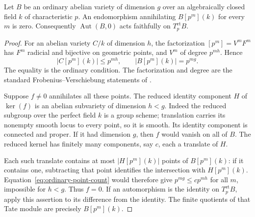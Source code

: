 \begin{lemma}\label{lem:ordinary-etale-faithful}
Let $B$ be an ordinary abelian variety of dimension $g$ over an algebraically closed field $k$ of characteristic $p$. An endomorphism annihilating $B[p^m](k)$ for every $m$ is zero. Consequently $\operatorname{Aut}(B,0)$ acts faithfully on $T_p^{\mathrm{et}}B$.
\end{lemma}
\begin{proof}
For an abelian variety $C/k$ of dimension $h$, the factorization $[p^m]=V^mF^m$ has $F^m$ radicial and bijective on geometric points, and $V^m$ of degree $p^{mh}$. Hence
\begin{equation}\label{eq:ordinary-point-count}
 |C[p^m](k)|\le p^{mh},\qquad |B[p^m](k)|=p^{mg}.
\end{equation}
The equality is the ordinary condition. The factorization and degree are the standard Frobenius--Verschiebung statements of \citet[Proposition~5.20, paragraph~5.21 and Proposition~5.22, pp.~80--81]{EdixhovenGeerMoonen}.

Suppose $f\ne0$ annihilates all these points. The reduced identity component $H$ of $\ker(f)$ is an abelian subvariety of dimension $h<g$. Indeed the reduced subgroup over the perfect field $k$ is a group scheme; translation carries its nonempty smooth locus to every point, so it is smooth. Its identity component is connected and proper. If it had dimension $g$, then $f$ would vanish on all of $B$. The reduced kernel has finitely many components, say $c$, each a translate of $H$.

Each such translate contains at most $|H[p^m](k)|$ points of $B[p^m](k)$: if it contains one, subtracting that point identifies the intersection with $H[p^m](k)$. Equation~\eqref{eq:ordinary-point-count} would therefore give $p^{mg}\le c p^{mh}$ for all $m$, impossible for $h<g$. Thus $f=0$. If an automorphism is the identity on $T_p^{\mathrm{et}}B$, apply this assertion to its difference from the identity. The finite quotients of that Tate module are precisely $B[p^m](k)$.
\end{proof}

